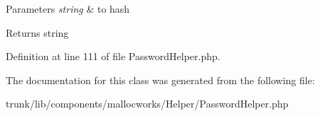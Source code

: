 \begin{DoxyParams}{Parameters}
{\em string} & to hash\\
\hline
\end{DoxyParams}
\begin{DoxyReturn}{Returns}
string 
\end{DoxyReturn}


Definition at line 111 of file PasswordHelper.php.



The documentation for this class was generated from the following file:\begin{DoxyCompactItemize}
\item 
trunk/lib/components/mallocworks/Helper/PasswordHelper.php\end{DoxyCompactItemize}
